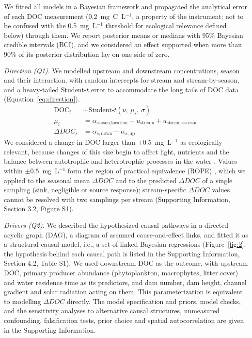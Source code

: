 \documentclass[pdflatex,sn-nature]{sn-jnl}   %
\begin{document}
We fitted all models in a Bayesian framework and propagated the analytical error of each DOC measurement (0.2~mg~C~L\(^{-1}\), a property of the instrument; not to be confused with the 0.5~mg~L\(^{-1}\) threshold for ecological relevance defined below) through them. We report posterior means or medians with 95\% Bayesian credible intervals (BCI), and we considered an effect supported when more than 90\% of its posterior distribution lay on one side of zero.

\emph{Direction (Q1).} We modelled upstream and downstream concentrations, season and their interaction, with random intercepts for stream and stream-by-season, and a heavy-tailed Student-\(t\) error to accommodate the long tails of DOC data (Equation~\ref{eq:direction}).
\begin{equation}
\begin{aligned}
\mathrm{DOC}_i &\sim \text{Student-}t(\nu,\ \mu_i,\ \sigma) \\
\mu_i &= \alpha_{\text{season},\text{location}} + u_{\text{stream}} + u_{\text{stream}\times\text{season}} \\
\Delta DOC_s &= \alpha_{s,\text{down}} - \alpha_{s,\text{up}}
\end{aligned}
\label{eq:direction}
\end{equation}
We considered a change in DOC larger than \(\pm0.5\)~mg~L\(^{-1}\) as ecologically relevant, because changes of this size begin to affect light, nutrients and the balance between autotrophic and heterotrophic processes in the water \cite{thrane2014,seekell2015}. Values within \(\pm0.5\)~mg~L\(^{-1}\) form the region of practical equivalence (ROPE) \cite{pan2025}, which we applied to the seasonal mean \(\Delta DOC\) and to the predicted \(\Delta DOC\) of a single sampling (sink, negligible or source response); stream-specific \(\Delta DOC\) values cannot be resolved with two samplings per stream (Supporting Information, Section 3.2, Figure S1).

\emph{Drivers (Q2).} We described the hypothesized causal pathways in a directed acyclic graph (DAG), a diagram of assumed cause-and-effect links, and fitted it as a structural causal model, i.e., a set of linked Bayesian regressions \cite{arif2023,gelman2013} (Figure~\ref{fig:2}; the hypothesis behind each causal path is listed in the Supporting Information, Section 4.2, Table S1). We used downstream DOC as the outcome, with upstream DOC, primary producer abundance (phytoplankton, macrophytes, litter cover) and water residence time as its predictors, and dam number, dam height, channel gradient and solar radiation acting on them. This parameterization is equivalent to modelling \(\Delta DOC\) directly. The model specification and priors, model checks, and the sensitivity analyses to alternative causal structures, unmeasured confounding, falsification tests, prior choice and spatial autocorrelation are given in the Supporting Information.
\end{document}
